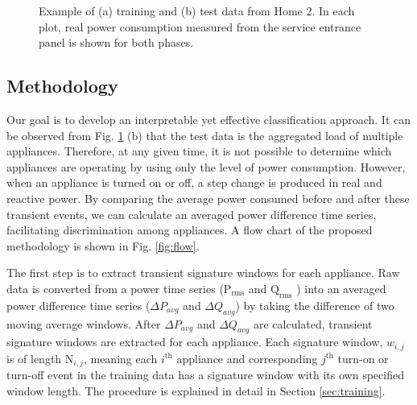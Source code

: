 \documentclass[conference]{IEEEtran}
\begin{document}
\begin{figure}[!t]	
	\centering
	\hfil
	\caption{Example of (a) training and (b) test data from Home 2.  In each plot, real power consumption measured from the service entrance panel is shown for both phases. } 
	\label{fig:traintest}
\end{figure}



\subsection{Methodology}
Our goal is to develop an interpretable yet effective classification approach.  It can be observed from Fig. \ref{fig:traintest} (b) that the test data is the aggregated load of multiple appliances.  Therefore, at any given time, it is not possible to determine which appliances are operating by using only the level of power consumption.  However, when an appliance is turned on or off, a step change is produced in real and reactive power.  By comparing the average power consumed before and after these transient events, we can calculate an averaged power difference time series, facilitating discrimination among appliances. A flow chart of the proposed methodology is shown in Fig. \ref{fig:flow}.

The first step is to extract transient signature windows for each appliance.  Raw data is converted from a power time series ($\text{P}_{\text{rms}}$ and $\text{Q}_{\text{rms}}$ ) into an averaged power difference time series ($\Delta P_{avg}$ and $\Delta Q_{avg}$) by taking the difference of two moving average windows.  After $\Delta P_{avg}$ and $\Delta Q_{avg}$ are calculated, transient signature windows are extracted for each appliance.  Each signature window, $w_{i,j}$ is of length $\text{N}_{i,j}$, meaning each $i^{\text{th}}$ appliance and corresponding $j^{\text{th}}$ turn-on or turn-off event in the training data has a signature window with its own specified window length. The procedure is explained in detail in Section \ref{sec:training}. 
\end{document}
